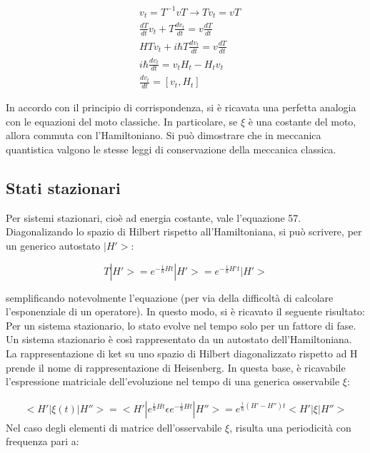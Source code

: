 \documentclass{article}
\begin{document}
\begin{equation}
    \begin{aligned}
         & v_t=T^{-1}vT \rightarrow Tv_t= vT                 \\
         & \frac{dT}{dt}v_t+T\frac{dv_t}{dt}= v\frac{dT}{dt} \\
         & HTv_t+i\hbar T \frac{d v_t}{dt}=v\frac{dT}{dt}    \\
         & i\hbar \frac{dv_t}{dt}=v_tH_t-H_tv_t              \\
         & \frac{dv_t}{dt}=[v_t, H_t]
    \end{aligned}
\end{equation}

In accordo con il principio di corrispondenza, si è ricavata una perfetta analogia con le equazioni del moto classiche.
In particolare, se $\xi$ è una costante del moto, allora commuta con l'Hamiltoniano.
Si può dimostrare che in meccanica quantistica valgono le stesse leggi di conservazione della meccanica classica.

\subsection{Stati stazionari}
Per sistemi stazionari, cioè ad energia costante, vale l'equazione 57.
Diagonalizando lo spazio di Hilbert rispetto all'Hamiltoniana, si può scrivere, per un generico autostato $|H'>$:

\begin{equation}
    T |H'>= e^{-\frac{i}{\hbar}Ht}|H'>= e^{-\frac{i}{\hbar}H't}|H'>
\end{equation}

semplificando notevolmente l'equazione (per via della difficoltà di calcolare l'esponenziale di un operatore).
In questo modo, si è ricavato il seguente risultato: Per un sistema stazionario, lo stato evolve nel tempo solo per un fattore di fase.
Un sistema stazionario è così rappresentato da un autostato dell'Hamiltoniana.
La rappresentazione di ket su uno spazio di Hilbert diagonalizzato rispetto ad H prende il nome di rappresentazione di Heisenberg.
In questa base, è ricavabile l'espressione matriciale dell'evoluzione nel tempo di una generica osservabile $\xi$:

\begin{equation}
    \begin{aligned}
        <H'|\xi(t)|H''>=<H'|e^{\frac{i}{\hbar}Ht}\epsilon e^{-\frac{i}{\hbar}Ht}|H''>=e^{\frac{i}{\hbar}(H'-H'')t}<H'|\xi|H''>
    \end{aligned}
\end{equation}
Nel caso degli elementi di matrice dell'osservabile $\xi$, risulta una periodicità con frequenza pari a:
\end{document}
